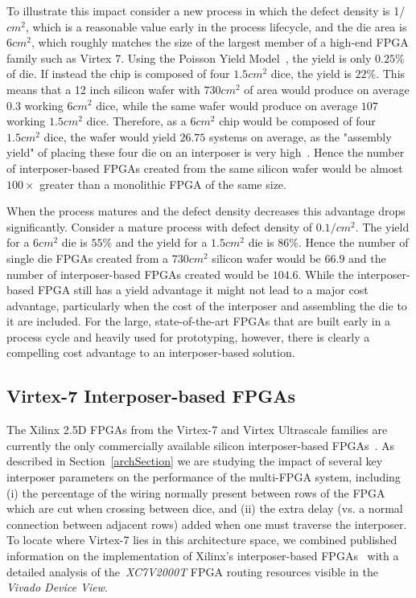 \documentclass[journal]{IEEEtran}
\begin{document}
To illustrate this impact consider a new process in which the defect density is 1/$cm^2$, which is a reasonable value early in the process lifecycle, and the die area is $6cm^2$, which roughly matches the size of the largest member of a high-end FPGA family such as Virtex 7. Using the Poisson Yield Model~\cite{yieldmodel}, the yield is only $0.25\%$ of die. If instead the chip is composed of four $1.5cm^2$ dice, the yield is $22\%$. This means that a 12 inch silicon wafer with $730cm^2$ of area would produce on average $0.3$ working $6cm^2$ dice, while the same wafer would produce on average $107$ working $1.5cm^2$ dice. Therefore, as a $6cm^2$ chip would be composed of four $1.5cm^2$ dice, the wafer would yield $26.75$ systems on average, as the "assembly yield" of placing these four die on an interposer is very high~\cite{xilinxTSV}. Hence the number of interposer-based FPGAs created from the same silicon wafer would be almost $100\times$ greater than a monolithic FPGA of the same size.

When the process matures and the defect density decreases this advantage drops significantly. Consider a mature process with defect density of $0.1/cm^2$. The yield for a $6cm^2$ die is $55\%$ and the yield for a $1.5cm^2$ die is $86\%$. Hence the number of single die FPGAs created from a $730cm^2$ silicon wafer would be $66.9$ and the number of interposer-based FPGAs created would be $104.6$. While the interposer-based FPGA still has a yield advantage it might not lead to a major cost advantage, particularly when the cost of the interposer and assembling the die to it are included. For the large, state-of-the-art FPGAs that are built early in a process cycle and heavily used for prototyping, however, there is clearly a compelling cost advantage to an interposer-based solution.

\subsection{Virtex-7 Interposer-based FPGAs}
\label{virtex7section}

The Xilinx 2.5D FPGAs from the Virtex-7 and Virtex Ultrascale families are currently the only commercially available silicon interposer-based FPGAs~\cite{xilinxWP}. As described in Section~\ref{archSection} we are studying the impact of several key interposer parameters on the performance of the multi-FPGA system, including (i) the percentage of the wiring normally present between rows of the FPGA which are cut when crossing between dice, and (ii) the extra delay (vs. a normal connection between adjacent rows) added when one must traverse the interposer.  To locate where Virtex-7 lies in this architecture space, we combined published information on the implementation of Xilinx's interposer-based FPGAs~\cite{xilinxTSV} with a detailed analysis of the~\textit{XC7V2000T} FPGA routing resources visible in the \textit{Vivado Device View}.
\end{document}
